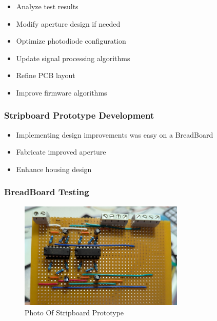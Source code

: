 
\begin{itemize}
  \item Analyze test results
  \item Modify aperture design if needed
  \item Optimize photodiode configuration
  \item Update signal processing algorithms
  \item Refine PCB layout
  \item Improve firmware algorithms
\end{itemize}

\subsubsection*{Stripboard Prototype Development}
\begin{itemize}
  \item Implementing design improvements was easy on a BreadBoard
  \item Fabricate improved aperture
  \item Enhance housing design
\end{itemize}


\subsubsection*{BreadBoard Testing}
%
\begin{figure}[htbp] %
  \centering
  \includegraphics[width=0.7\textwidth]{chapters/methodology/prototype/StripboardPhoto.jpg}
  \caption{Photo Of Stripboard Prototype}
  \label{fig:StripboardPhoto}
\end{figure}


